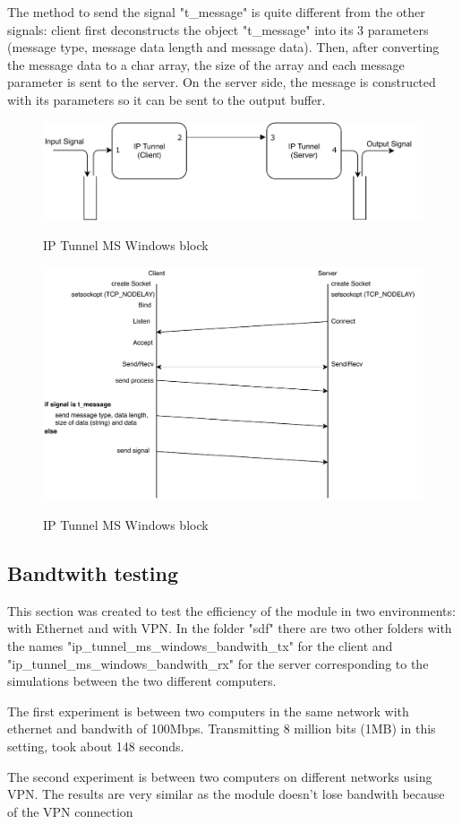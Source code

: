 The method to send the signal "t\_message" is quite different from the other signals: client first deconstructs the object "t\_message" into its 3 parameters (message type, message data length and message data). Then, after converting the message data to a char array, the size of the array and each message parameter is sent to the server. On the server side, the message is constructed with its parameters so it can be sent to the output buffer.

\begin{figure}[h]
	\centering
	\includegraphics[width=1.0\textwidth]{./lib/ip_tunnel_ms_windows/figures/StructureTCPIP4.pdf}
	\label{IP Tunnel Block}\caption{IP Tunnel MS Windows block}
\end{figure}

\begin{figure}[h]
	\centering
	\includegraphics{./lib/ip_tunnel_ms_windows/figures/FluxogramIPTunnel.pdf}
	\label{IP Tunnel Block}\caption{IP Tunnel MS Windows block}
\end{figure}


\subsection*{Bandtwith testing}

This section was created to test the efficiency of the module in two environments: with Ethernet and with VPN.
In the folder "sdf" there are two other folders with the names "ip\_tunnel\_ms\_windows\_bandwith\_tx" for the client and "ip\_tunnel\_ms\_windows\_bandwith\_rx" for the server corresponding to the simulations between the two different computers.\par
The first experiment is between two computers in the same network with ethernet and bandwith of 100Mbps. Transmitting 8 million bits (1MB) in this setting, took about 148 seconds. 
\par

The second experiment is between two computers on different networks using VPN. The results are very similar as the module doesn't lose bandwith because of the VPN connection

